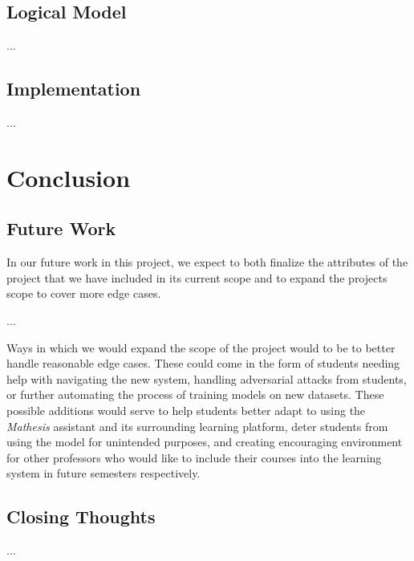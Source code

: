 \documentclass[12pt,a4paper]{article}
\begin{document}
    \subsection{Logical Model}
    ...

    \subsection{Implementation}
    ...

    \section{Conclusion}

    \subsection{Future Work}
    In our future work in this project, we expect to both finalize the attributes of the project that
    we have included in its current scope and to expand the projects scope to cover more edge cases.

    ...

    Ways in which we would expand the scope of the project would to be to better handle reasonable
    edge cases.  These could come in the form of students needing help with navigating the new system,
    handling adversarial attacks from students, or further automating the process of training models
    on new datasets.  These possible additions would serve to help students better adapt to using the
    \textit{Mathesis} assistant and its surrounding learning platform, deter students from using
    the model for unintended purposes, and creating encouraging environment for other professors who
    would like to include their courses into the learning system in future semesters respectively.

    \subsection{Closing Thoughts}
    ...

    \pagebreak
\end{document}
